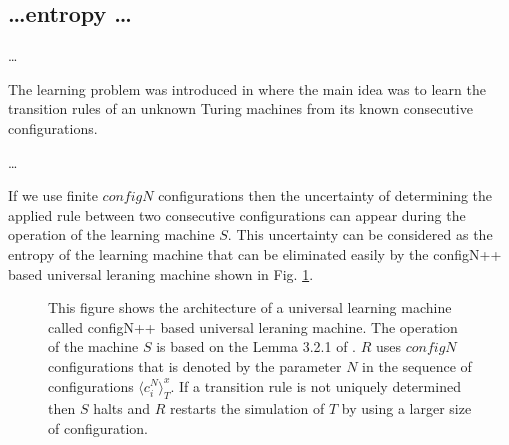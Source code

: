 \subsection{\dots entropy \dots}

\dots

The learning problem was introduced in \cite{TheorRobopsy} where the main idea was to learn the transition rules of an unknown Turing machines from its known consecutive configurations.

\dots

If we use finite $configN$ configurations then the uncertainty of determining the applied rule between two consecutive configurations can appear during the operation of the learning machine $S$. This uncertainty can be considered as the entropy of the learning machine that can be eliminated easily by the configN++ based universal leraning machine shown in Fig. \ref{fig_ULM}.

\cite{Turing}
\cite{Neumann}
\cite{TheorRobopsy}
\cite{WhatIsLife}

\begin{figure}[!h]
\centering
\scalebox{1}{}
\caption{This figure shows the architecture of a universal learning machine called configN++ based universal leraning machine. The operation of the machine $S$ is based on the Lemma 3.2.1 of \cite{TheorRobopsy}. $R$ uses $configN$ configurations that is denoted by the parameter $N$ in the sequence of configurations ${\langle c^N_i\rangle}_T^x$. If a transition rule is not uniquely determined then $S$ halts and $R$ restarts the simulation of $T$ by using a larger size of configuration.\label{fig_ULM}}
\end{figure}

